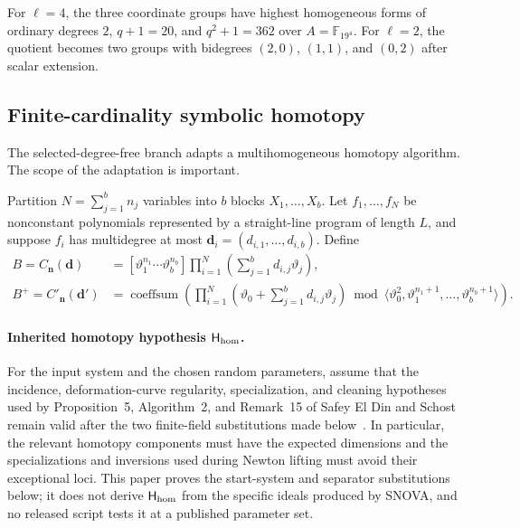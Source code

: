 \documentclass[11pt]{article}
\newcommand{\F}{\mathbb F}
\newcommand{\SNOVA}{\textsf{SNOVA}}
\begin{document}
For $\ell=4$, the three coordinate groups have highest homogeneous forms of
ordinary degrees $2$, $q+1=20$, and $q^2+1=362$ over $A=\F_{19^4}$.
For $\ell=2$, the quotient becomes two groups with bidegrees $(2,0)$,
$(1,1)$, and $(0,2)$ after scalar extension.

\subsection{Finite-cardinality symbolic homotopy}
The selected-degree-free branch adapts a multihomogeneous homotopy algorithm.
The scope of the adaptation is important.

Partition $N=\sum_{j=1}^b n_j$ variables into $b$ blocks
$X_1,\ldots,X_b$.  Let $f_1,\ldots,f_N$ be nonconstant polynomials represented
by a straight-line program of length $L$, and suppose $f_i$ has
multidegree at most $\mathbf d_i=(d_{i,1},\ldots,d_{i,b})$.  Define
\begin{align}
 B=C_{\mathbf n}(\mathbf d)
 &= [\vartheta_1^{n_1}\cdots\vartheta_b^{n_b}]
    \prod_{i=1}^N\left(\sum_{j=1}^b d_{i,j}\vartheta_j\right),
                                                        \label{eq:bg-Bezout}\\
B^+=C'_{\mathbf n}(\mathbf d')
 &=\operatorname{coeffsum}\!\left(
    \prod_{i=1}^N\left(\vartheta_0+
      \sum_{j=1}^b d_{i,j}\vartheta_j\right)
    \bmod\langle\vartheta_0^2,
      \vartheta_1^{n_1+1},\ldots,\vartheta_b^{n_b+1}\rangle
    \right).                                         \label{eq:bg-Bplus}
\end{align}

\paragraph{Inherited homotopy hypothesis $\mathsf H_{\rm hom}$.}
For the input system and the chosen random parameters, assume that the
incidence, deformation-curve regularity, specialization, and cleaning
hypotheses used by Proposition~5, Algorithm~2, and Remark~15 of
Safey El Din and Schost remain valid after the two finite-field substitutions
made below~\cite{SafeyElDinSchost2018}.  In particular, the relevant homotopy
components must have the expected dimensions and the specializations and
inversions used during Newton lifting must avoid their exceptional loci.  This
paper proves the start-system and separator substitutions below; it does not
derive $\mathsf H_{\rm hom}$ from the specific ideals produced by \SNOVA{}, and
no released script tests it at a published parameter set.
\end{document}
